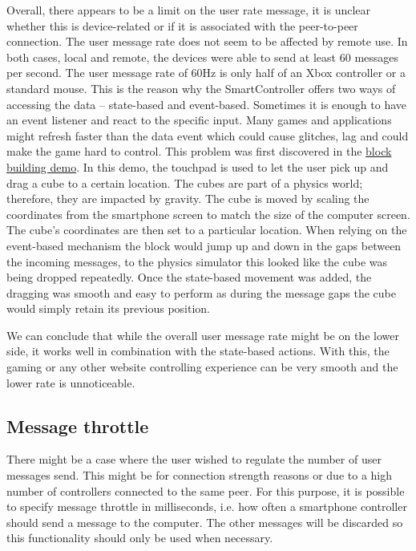 \documentclass{l4proj}
\begin{document}
Overall, there appears to be a limit on the user rate message, it is unclear whether this is device-related or if it is associated with the peer-to-peer connection. The user message rate does not seem to be affected by remote use. In both cases, local and remote, the devices were able to send at least 60 messages per second. The user message rate of 60Hz is only half of an Xbox controller or a standard mouse. This is the reason why the SmartController offers two ways of accessing the data – state-based and event-based. Sometimes it is enough to have an event listener and react to the specific input. Many games and applications might refresh faster than the data event which could cause glitches, lag and could make the game hard to control. This problem was first discovered in the \href{https://emmapoliakova.github.io/WebRTCSmartphoneController/physics/physicsDemoV3.html}{block building demo}. In this demo, the touchpad is used to let the user pick up and drag a cube to a certain location. The cubes are part of a physics world; therefore, they are impacted by gravity. The cube is moved by scaling the coordinates from the smartphone screen to match the size of the computer screen. The cube's coordinates are then set to a particular location. When relying on the event-based mechanism the block would jump up and down in the gaps between the incoming messages, to the physics simulator this looked like the cube was being dropped repeatedly. Once the state-based movement was added, the dragging was smooth and easy to perform as during the message gaps the cube would simply retain its previous position. \par 
We can conclude that while the overall user message rate might be on the lower side, it works well in combination with the state-based actions. With this, the gaming or any other website controlling experience can be very smooth and the lower rate is unnoticeable. 


\subsection{Message throttle}
There might be a case where the user wished to regulate the number of user messages send. This might be for connection strength reasons or due to a high number of controllers connected to the same peer. For this purpose, it is possible to specify message throttle in milliseconds, i.e. how often a smartphone controller should send a message to the computer. The other messages will be discarded so this functionality should only be used when necessary. \par 
\end{document}
